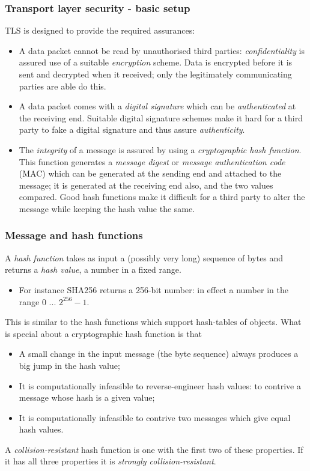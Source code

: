 \documentclass[10pt, hyperref={pdfpagelabels=false}]{beamer}
\begin{document}
\begin{frame}
\frametitle{Transport layer security - basic setup}
TLS is designed to provide the required assurances:
\begin{itemize}
\item A data packet cannot be read by unauthorised third parties: \emph{\color{blue}confidentiality} is assured use of a suitable \emph{encryption} scheme. Data is encrypted before it is sent and decrypted when it received; only the legitimately communicating parties are able do this.
\item A data packet comes with a \emph{digital signature} which can be \emph{authenticated} at the receiving end. Suitable digital signature schemes make it hard for a third party to fake a digital signature and thus assure \emph{\color{blue}authenticity}.
\item The \emph{\color{blue}integrity} of a message is assured by using a \emph{cryptographic hash function}. This function generates a \emph{message digest} or \emph{message authentication code} (MAC) which can be generated at the sending end and attached to the message; it is generated at the receiving end also, and the two values compared. Good hash functions make it difficult for a third party to alter the message while keeping the hash value the same.
\end{itemize} 
\end{frame}

\begin{frame}
\frametitle{Message and hash functions}
A \emph{hash function} takes as input a (possibly very long) sequence of bytes and returns a \emph{hash value}, a number in a fixed range.
\begin{itemize}
\item For instance SHA256 returns a 256-bit number: in effect a number in the range 0 ... $2^{256}-1$.
\end{itemize} 

This is similar to the hash functions which support hash-tables of objects. What is special about a cryptographic hash function is that
\begin{itemize}
\item A small change in the input message (the byte sequence) always produces a big jump in the hash value;
\item It is computationally infeasible to reverse-engineer hash values: to contrive a message whose hash is a given value;
\item It is computationally infeasible to contrive two messages which give equal hash values.
\end{itemize} 

A \emph{\color{blue}collision-resistant} hash function is one with the first two of these properties. If it has all three properties it is \emph{\color{blue}strongly collision-resistant}.
\end{frame}
\end{document}
